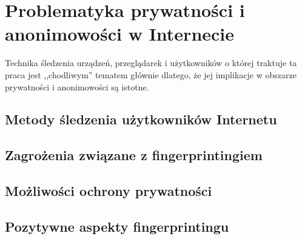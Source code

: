 \chapter{Problematyka prywatności i anonimowości w Internecie}
Technika śledzenia urządzeń, przeglądarek i użytkowników o której traktuje ta
praca jest ,,chodliwym'' tematem głównie dlatego, że jej implikacje w obszarze
prywatności i anonimowości są istotne.

\section{Metody śledzenia użytkowników Internetu}

\section{Zagrożenia związane z fingerprintingiem}

\section{Możliwości ochrony prywatności}

\section{Pozytywne aspekty fingerprintingu}
